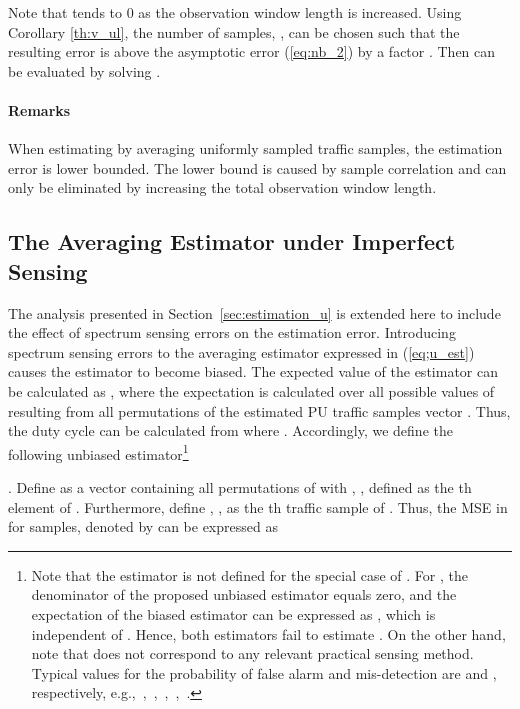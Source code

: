 \documentclass[11pt,draftclsnofoot,journal,onecolumn]{IEEEtran}
\begin{document}
Note that  tends to 0 as the observation window length is increased. Using Corollary \ref{th:v_ul}, the number of samples, , can be chosen such that the resulting error is above the asymptotic error (\ref{eq:nb_2}) by a factor . Then  can be evaluated by solving .

\paragraph*{Remarks}

When estimating  by averaging uniformly sampled traffic samples, the estimation error is lower bounded. The lower bound is caused by sample correlation and can only be eliminated by increasing the total observation window length.

\subsection{The Averaging Estimator under Imperfect Sensing}
\label{sec:estimation_u_err}

The analysis presented in Section~\ref{sec:estimation_u} is extended here to include the effect of spectrum sensing errors on the estimation error. Introducing spectrum sensing errors to the averaging estimator expressed in (\ref{eq;u_est}) causes the estimator to become biased. The expected value of the estimator can be calculated as , where the expectation is calculated over all possible values of  resulting from all  permutations of the estimated PU traffic samples vector . Thus, the duty cycle can be calculated from  where . Accordingly, we define the following unbiased estimator\footnote{Note that the estimator  is not defined for the special case of . For , the denominator of the proposed unbiased estimator equals zero, and the expectation of the biased estimator can be expressed as , which is independent of . Hence, both estimators fail to estimate . On the other hand, note that  does not correspond to any relevant practical sensing method. Typical values for the probability of false alarm and mis-detection are  and , respectively, e.g.,~\cite[Sec. VII-C]{arslan_tutorial},~\cite[Sec. VI-A]{tian_twc_2012},~\cite{Gerihofer_commag_2007,stevenson_commag_2009},~\cite[Sec. 6.6]{min_tmc_2011},~\cite[Sec. IV-A]{kim_twc_2010}.}

. Define  as a vector containing all  permutations of  with , , defined as the th element of . Furthermore, define , , as the th traffic sample of . Thus, the MSE in  for  samples, denoted by  can be expressed as
\end{document}
